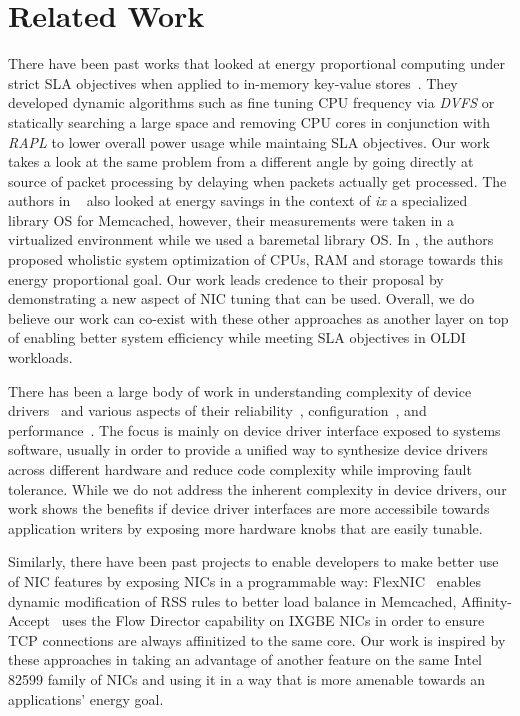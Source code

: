 \documentclass[letterpaper,twocolumn,10pt]{article}
\begin{document}
\section{Related Work}
There have been past works that looked at energy proportional computing under strict SLA objectives when applied to in-memory key-value stores~\cite{10.1145/2678373.2665718, 10.1145/2806777.2806848}. They developed dynamic algorithms such as fine tuning CPU frequency via \textit{DVFS} or statically searching a large space and removing CPU cores in conjunction with \textit{RAPL} to lower overall power usage while maintaing SLA objectives. Our work takes a look at the same problem from a different angle by going directly at source of packet processing by delaying when packets actually get processed. The authors in ~\cite{10.1145/2806777.2806848} also looked at energy savings in the context of \textit{ix} a specialized library OS for Memcached, however, their measurements were taken in a virtualized environment while we used a baremetal library OS. In \cite{10.1145/2024723.2000103}, the authors proposed wholistic system optimization of CPUs, RAM and storage towards this energy proportional goal. Our work leads credence to their proposal by demonstrating a new aspect of NIC tuning that can be used. Overall, we do believe our work can co-exist with these other approaches as another layer on top of enabling better system efficiency while meeting SLA objectives in OLDI workloads.

There has been a large body of work in understanding complexity of device drivers~\cite{Kadav:2012:UMD:2150976.2150987} and various aspects of their reliability~\cite{Ball:2006:TSA:1217935.1217943, LeVasseur:2004:UDD:1251254.1251256, Ryzhyk:2009:DTD:1519065.1519095}, configuration~\cite{Renzelmann:2009:DMD:1855807.1855821, Ryzhyk:2014:UDD:2685048.2685101, Schupbach:2011:DLA:1950365.1950382}, and performance~\cite{Ganapathy:2008:DIM:1346281.1346303, Ryzhyk:2010:CAD:1851276.1851283}. The focus is mainly on device driver interface exposed to systems software, usually in order to provide a unified way to synthesize device drivers across different hardware and reduce code complexity while improving fault tolerance. While we do not address the inherent complexity in device drivers, our work shows the benefits if device driver interfaces are more accessibile towards application writers by exposing more hardware knobs that are easily tunable.

Similarly, there have been past projects to enable developers to make better use of NIC features by exposing NICs in a programmable way: FlexNIC~\cite{flexnic} enables dynamic modification of RSS rules to better load balance in Memcached, Affinity-Accept~\cite{affinityaccept} uses the Flow Director capability on IXGBE NICs in order to ensure TCP connections are always affinitized to the same core. Our work is inspired by these approaches in taking an advantage of another feature on the same Intel 82599 family of NICs and using it in a way that is more amenable towards an applications' energy goal.
\end{document}
